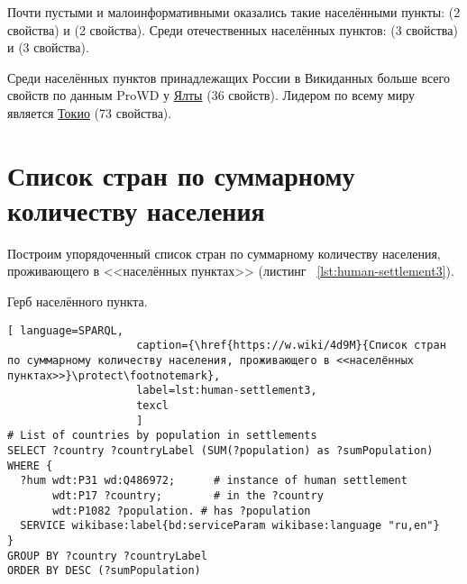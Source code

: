 Почти пустыми и малоинформативными оказались такие населёнными пункты:  (2 свойства) и  (2 свойства). Среди отечественных населённых пунктов:  (3 свойства) и  (3 свойства).

Среди населённых пунктов принадлежащих России в Викиданных больше всего свойств по данным ProWD у \href{http://www.wikidata.org/entity/Q128499}{Ялты} (36 свойств). Лидером по всему миру является \href{http://www.wikidata.org/entity/Q1490}{Токио} (73 свойства)\autocite{humansettlements_ProWD}.

\section{Список стран по суммарному количеству населения}

Построим упорядоченный список стран по суммарному количеству населения, проживающего в <<населённых пунктах>> (листинг ~\protect\ref{lst:human-settlement3}).

\begin{marginfigure}[0.0cm]
{
\setlength{\fboxsep}{0pt}%
\setlength{\fboxrule}{1pt}%
%
}
  \caption{Герб населённого пункта.}%
  \label{fig:flag_question_human_settlements2}%
\end{marginfigure}


\lstset{numbers=left, firstnumber=1, frame=single}
\begin{lstlisting}[ language=SPARQL, 
                    caption={\href{https://w.wiki/4d9M}{Список стран по суммарному количеству населения, проживающего в <<населённых пунктах>>}\protect\footnotemark},
                    label=lst:human-settlement3,
                    texcl 
                    ]
# List of countries by population in settlements
SELECT ?country ?countryLabel (SUM(?population) as ?sumPopulation)
WHERE {
  ?hum wdt:P31 wd:Q486972;  	# instance of human settlement
       wdt:P17 ?country;    	# in the ?country
       wdt:P1082 ?population. # has ?population
  SERVICE wikibase:label{bd:serviceParam wikibase:language "ru,en"}
}
GROUP BY ?country ?countryLabel 
ORDER BY DESC (?sumPopulation)
\end{lstlisting}%

